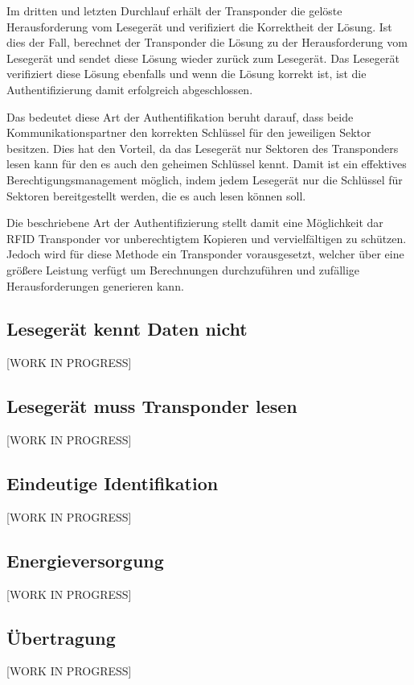 \documentclass[conference]{IEEEtran}
\begin{document}
Im dritten und letzten Durchlauf erhält der Transponder die gelöste Herausforderung vom Lesegerät und verifiziert die Korrektheit der Lösung. Ist dies der Fall, berechnet der Transponder die Lösung zu der Herausforderung  vom Lesegerät und sendet diese Lösung wieder zurück zum Lesegerät. Das Lesegerät verifiziert diese Lösung ebenfalls und wenn die Lösung korrekt ist, ist die Authentifizierung damit erfolgreich abgeschlossen.

Das bedeutet diese Art der Authentifikation beruht darauf, dass beide Kommunikationspartner den korrekten Schlüssel für den jeweiligen Sektor besitzen. Dies hat den Vorteil, da das Lesegerät nur Sektoren des Transponders lesen kann für den es auch den geheimen Schlüssel kennt. Damit ist ein effektives Berechtigungsmanagement möglich, indem jedem Lesegerät nur die Schlüssel für Sektoren bereitgestellt werden, die es auch lesen können soll.

Die beschriebene Art der Authentifizierung stellt damit eine Möglichkeit dar RFID Transponder vor unberechtigtem Kopieren und vervielfältigen zu schützen. Jedoch wird für diese Methode ein Transponder vorausgesetzt, welcher über eine größere Leistung verfügt um Berechnungen durchzuführen und zufällige Herausforderungen generieren kann.

\subsection{Lesegerät kennt Daten nicht}
[WORK IN PROGRESS]

\subsection{Lesegerät muss Transponder lesen}
[WORK IN PROGRESS]

\subsection{Eindeutige Identifikation}
[WORK IN PROGRESS]

\subsection{Energieversorgung}
[WORK IN PROGRESS]

\subsection{Übertragung}
[WORK IN PROGRESS]
\end{document}
